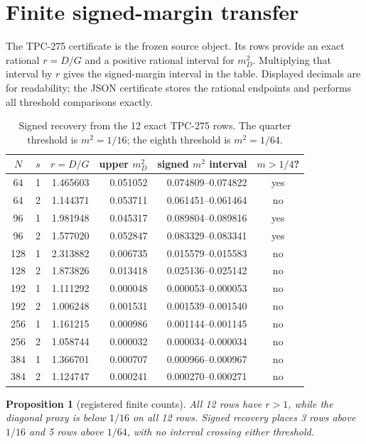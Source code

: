 \documentclass[11pt]{article}
\newcommand{\Dpack}{D}
\newcommand{\Gpack}{G}
\newcommand{\md}{m_D}
\newtheorem{proposition}[theorem]{Proposition}
\begin{document}
\section{Finite signed-margin transfer}

The TPC-275 certificate is the frozen source object.  Its rows provide an exact
rational \(r=\Dpack/\Gpack\) and a positive rational interval for \(\md^2\).
Multiplying that interval by \(r\) gives the signed-margin interval in the
table.  Displayed decimals are for readability; the JSON certificate stores
the rational endpoints and performs all threshold comparisons exactly.

\begin{table}[t]
\centering
\scriptsize
\begin{tabular}{c c r r r c}
\toprule
 $N$ & $s$ & $r=D/G$ & upper $m_D^2$ & signed $m^2$ interval & $m>1/4$?\\
\midrule
 64  & 1 & 1.465603 & 0.051052 & 0.074809--0.074822 & yes\\
 64  & 2 & 1.144371 & 0.053711 & 0.061451--0.061464 & no\\
 96  & 1 & 1.981948 & 0.045317 & 0.089804--0.089816 & yes\\
 96  & 2 & 1.577020 & 0.052847 & 0.083329--0.083341 & yes\\
 128 & 1 & 2.313882 & 0.006735 & 0.015579--0.015583 & no\\
 128 & 2 & 1.873826 & 0.013418 & 0.025136--0.025142 & no\\
 192 & 1 & 1.111292 & 0.000048 & 0.000053--0.000053 & no\\
 192 & 2 & 1.006248 & 0.001531 & 0.001539--0.001540 & no\\
 256 & 1 & 1.161215 & 0.000986 & 0.001144--0.001145 & no\\
 256 & 2 & 1.058744 & 0.000032 & 0.000034--0.000034 & no\\
 384 & 1 & 1.366701 & 0.000707 & 0.000966--0.000967 & no\\
 384 & 2 & 1.124747 & 0.000241 & 0.000270--0.000271 & no\\
\bottomrule
\end{tabular}
\caption{Signed recovery from the 12 exact TPC-275 rows.  The quarter
threshold is \(m^2=1/16\); the eighth threshold is \(m^2=1/64\).}
\end{table}

\begin{proposition}[registered finite counts]
All 12 rows have \(r>1\), while the diagonal proxy is below \(1/16\) on all
12 rows.  Signed recovery places 3 rows above \(1/16\) and 5 rows above
\(1/64\), with no interval crossing either threshold.
\end{proposition}
\end{document}
